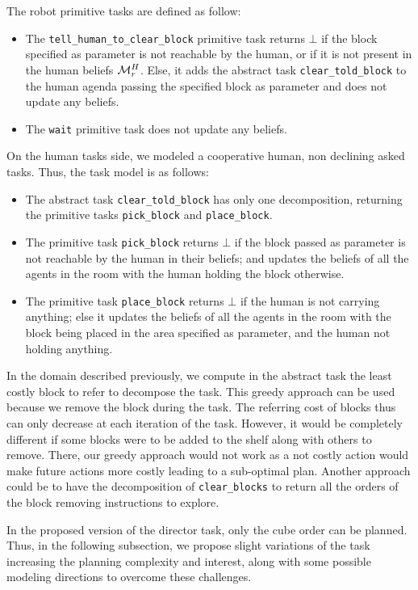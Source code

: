 \documentclass[a4paper,11pt,twoside]{StyleThese}
\begin{document}
The robot primitive tasks are defined as follow:
\begin{itemize}
\item The \verb'tell_human_to_clear_block' primitive task returns $\bot$ if the block specified as parameter is not reachable by the human, or if it is not present in the human beliefs $\mathcal{M}^H_r$. Else, it adds the abstract task \verb'clear_told_block' to the human agenda passing the specified block as parameter and does not update any beliefs.
\item The \verb'wait' primitive task does not update any beliefs.
\end{itemize}

On the human tasks side, we modeled a cooperative human, non declining asked tasks. Thus, the task model is as follows:
\begin{itemize}
\item The abstract task \verb'clear_told_block' has only one decomposition, returning the primitive tasks \verb'pick_block' and \verb'place_block'.
\item The primitive task \verb'pick_block' returns $\bot$ if the block passed as parameter is not reachable by the human in their beliefs; and updates the beliefs of all the agents in the room with the human holding the block otherwise.
\item The primitive task \verb'place_block' returns $\bot$ if the human is not carrying anything; else it updates the beliefs of all the agents in the room with the block being placed in the area specified as parameter, and the human not holding anything.
\end{itemize}

In the domain described previously, we compute in the abstract task the least costly block to refer to decompose the task. This greedy approach can be used because we remove the block during the task. The referring cost of blocks thus can only decrease at each iteration of the task. However, it would be completely different if some blocks were to be added to the shelf along with others to remove. There, our greedy approach would not work as a not costly action would make future actions more costly leading to a sub-optimal plan. Another approach could be to have the decomposition of \verb'clear_blocks' to return all the orders of the block removing instructions to explore.

In the proposed version of the director task, only the cube order can be planned. Thus, in the following subsection, we propose slight variations of the task increasing the planning complexity and interest, along with some possible modeling directions to overcome these challenges.
\end{document}
